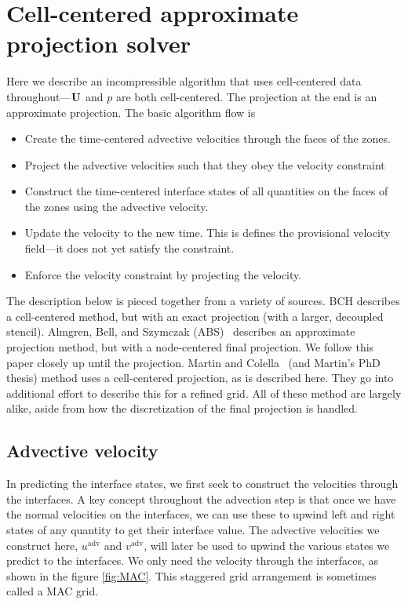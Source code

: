 \section{Cell-centered approximate projection solver}

Here we describe an incompressible algorithm that uses cell-centered
data throughout---${\bf U}$ and $p$ are both cell-centered.  The
projection at the end is an approximate projection.  The basic
algorithm flow is 
\begin{itemize}
\item Create the time-centered advective velocities through the faces
  of the zones.
\item Project the advective velocities such that they obey the
  velocity constraint
\item Construct the time-centered interface states of all quantities
  on the faces of the zones using the advective velocity.
\item Update the velocity to the new time.  This is defines the
  provisional velocity field---it does not yet satisfy the constraint.
\item Enforce the velocity constraint by projecting the velocity.
\end{itemize}

The description below is pieced together from a variety of sources.
BCH describes a cell-centered method, but with an exact projection
(with a larger, decoupled stencil).  Almgren, Bell, and Szymczak
(ABS)~\cite{ABS} describes an approximate projection method, but with
a node-centered final projection.  We follow this paper closely up
until the projection.  Martin and Colella~\cite{MartinColella} (and
Martin's PhD thesis) method uses a cell-centered projection, as is
described here.  They go into additional effort to describe this for a
refined grid.  All of these method are largely alike, aside from how
the discretization of the final projection is handled.

\subsection{Advective velocity}

In predicting the interface states, we first seek to construct the
velocities through the interfaces.  A key concept throughout the
advection step is that once we have the normal velocities on the
interfaces, we can use these to upwind left and right states of any
quantity to get their interface value.  The advective velocities we
construct here, ${u}^\mathrm{adv}$ and ${v}^\mathrm{adv}$,
will later be used to upwind the various states we predict to the
interfaces.  We only need the velocity through the interfaces, as
shown in the figure \ref{fig:MAC}. This staggered grid arrangement is
sometimes called a MAC grid.

